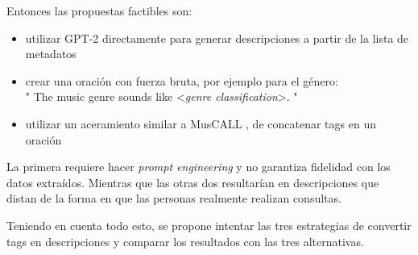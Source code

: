 Entonces las propuestas factibles son: 
\begin{itemize}
    \item utilizar GPT-2 directamente para generar descripciones a partir de la lista de metadatos
    \item crear una oración con fuerza bruta, por ejemplo para el género: \\" The music genre sounds like <\textit{genre classification}>. "
    \item utilizar un aceramiento similar a MusCALL \cite{Manco2022ContrastiveAL}, de concatenar tags en un oración
\end{itemize}
La primera requiere hacer \textit{prompt engineering} y no garantiza fidelidad con los datos extraídos. Mientras que las otras dos resultarían en descripciones que distan de la forma en que las personas realmente realizan consultas. 

Teniendo en cuenta todo esto, se propone intentar las tres estrategias de convertir tags en descripciones y comparar los resultados con las tres alternativas.\\

